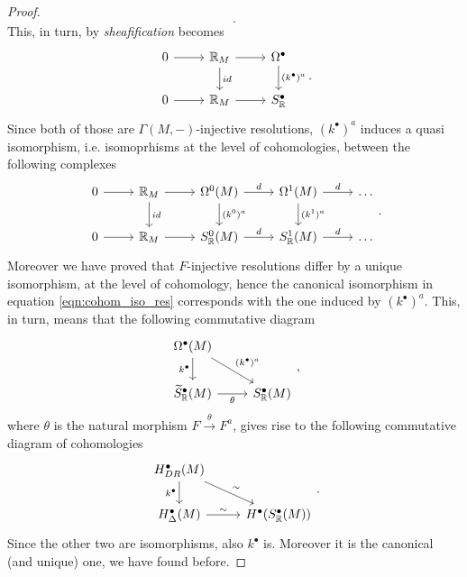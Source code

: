 \begin{proof}
\begin{equation}
	.\end{equation} 
	This, in turn, by \textit{sheafification} becomes
	\begin{equation}
	\begin{tikzcd}
		0 \arrow[r, "", rightarrow] & \R_M \arrow[r, "", rightarrow] \arrow[d, "id", rightarrow] & \Omega^\bullet \arrow[d, "{(k^\bullet)^a}", rightarrow] \\
		0 \arrow[r, "", rightarrow] & \R_M \arrow[r, "", rightarrow] & S^\bullet_\R
	\end{tikzcd}
	.\end{equation} 
	Since both of those are $\Gamma(M,-)$-injective resolutions, $(k^\bullet)^a$ induces a quasi isomorphism, i.e. isomoprhisms at the level of cohomologies, between the following complexes
	\begin{equation}
	\begin{tikzcd}
		0 \arrow[r, "", rightarrow] & \R_M \arrow[r, "", rightarrow] \arrow[d, "id", rightarrow] & \Omega^0(M) \arrow[r, "d", rightarrow] \arrow[d, "{(k^0)^a}", rightarrow] & \Omega^1(M) \arrow[r, "d", rightarrow] \arrow[d, "{(k^1)^a}", rightarrow] & \dots \\
		0 \arrow[r, "", rightarrow] & \R_M \arrow[r, "", rightarrow] & S^0_\R(M) \arrow[r, "d", rightarrow] & S^1_\R(M) \arrow[r, "d", rightarrow] & \dots
	\end{tikzcd}
	.\end{equation} 
	Moreover we have proved that $F$-injective resolutions differ by a unique isomorphism, at the level of cohomology, hence the canonical isomorphism in equation \eqref{eqn:cohom_iso_res} corresponds with the one induced by $(k^\bullet)^a$.
	This, in turn, means that the following commutative diagram
	\begin{equation}
	\begin{tikzcd}
		\Omega^\bullet(M) \arrow[d, "k^\bullet"', rightarrow] \arrow[rd, "(k^\bullet)^a", rightarrow] & \\
		\widetilde{S}^\bullet_\R(M) \arrow[r, "\theta"', rightarrow] & S^\bullet_\R(M)
	\end{tikzcd}
	,\end{equation} 
	where $\theta$ is the natural morphism $F \xrightarrow{\theta} F^a$, gives rise to the following commutative diagram of cohomologies
	\begin{equation}
	\begin{tikzcd}
		H^\bullet_{DR}(M) \arrow[d, "k^\bullet"', rightarrow] \arrow[rd, "\sim", rightarrow] & \\
		H^\bullet_\Delta(M) \arrow[r, "\sim", rightarrow] & H^\bullet(S^\bullet_\R(M))
	\end{tikzcd}
	.\end{equation} 
	Since the other two are isomorphisms, also $k^\bullet$ is.
	Moreover it is the canonical (and unique) one, we have found before.
\end{proof}
